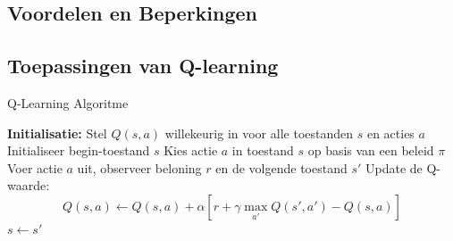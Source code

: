 \documentclass[a4paper,12pt]{report}
\begin{document}
\subsection{Voordelen en Beperkingen}
\subsection{Toepassingen van Q-learning}

\begin{algorithm}
    \caption{Q-Learning Algoritme}\label{alg:Q-learning}
    \begin{algorithmic}
        \State \textbf{Initialisatie:} Stel $Q(s, a)$ willekeurig in voor alle toestanden $s$ en acties $a$
        \State Initialiseer begin-toestand $s$
        \State Kies actie $a$ in toestand $s$ op basis van een beleid $\pi$
        \State Voer actie $a$ uit, observeer beloning $r$ en de volgende toestand $s'$
        \State Update de Q-waarde:
        \[
            Q(s, a) \gets Q(s, a) + \alpha \left[ r + \gamma \max_{a'} Q(s', a') - Q(s, a) \right]
        \]
        \State $s \gets s'$
        \EndWhile
        \EndFor
    \end{algorithmic}
\end{algorithm}
\end{document}
